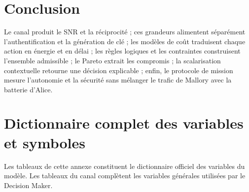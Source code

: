 \documentclass[conference,a4paper]{IEEEtran}
\begin{document}
\section{Conclusion}
Le canal produit le SNR et la réciprocité ; ces grandeurs alimentent séparément l'authentification et la génération de clé ; les modèles de coût traduisent chaque action en énergie et en délai ; les règles logiques et les contraintes construisent l'ensemble admissible ; le Pareto extrait les compromis ; la scalarisation contextuelle retourne une décision explicable ; enfin, le protocole de mission mesure l'autonomie et la sécurité sans mélanger le trafic de Mallory avec la batterie d'Alice.


\clearpage
\appendices
\onecolumn

\section{Dictionnaire complet des variables et symboles}
\label{ann:variables}
Les tableaux de cette annexe constituent le dictionnaire officiel des variables du modèle. Les tableaux du canal complètent les variables générales utilisées par le Decision Maker.
\end{document}
